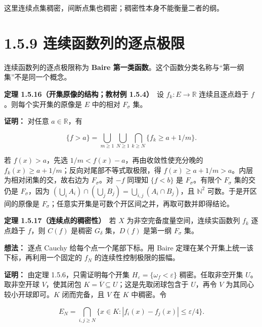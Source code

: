 \documentclass[11pt,a4paper]{article}
\begin{document}
这里连续点集稠密，间断点集也稠密；稠密性本身不能衡量二者的纲。

\section[\S{}1.5.9
连续函数列的逐点极限]{1.5.9
连续函数列的逐点极限}\label{ux8fdeux7eedux51fdux6570ux5217ux7684ux9010ux70b9ux6781ux9650}

连续函数列的逐点极限称为 \textbf{Baire
第一类函数}。这个函数分类名称与``第一纲集''不是同一个概念。

\textbf{定理 1.5.16（开集原像的结构；教材例 1.5.4）}　设
\(f_k:E\to\mathbb R\) 连续且逐点趋于 \(f\)。则每个实开集的原像是 \(E\)
中的相对 \(F_\sigma\) 集。

\textbf{证明：} 对任意 \(a\in\mathbb R\)，有

\begin{equation*}
\{f>a\}=\bigcup_{m\ge1}\bigcup_{N\ge1}\bigcap_{k\ge N}\{f_k\ge a+1/m\}.
\tag{1.5.14}
\end{equation*}

若 \(f(x)>a\)，先选 \(1/m<f(x)-a\)，再由收敛性使充分晚的
\(f_k(x)\ge a+1/m\)；反向对尾部不等式取极限，得
\(f(x)\ge a+1/m>a\)。内层为相对闭集的交，故右边为 \(F_\sigma\)。对
\(-f\) 同理知 \(\{f<b\}\) 是 \(F_\sigma\)。有限个 \(F_\sigma\)
集的交仍是 \(F_\sigma\)，因为
\((\bigcup_iA_i)\cap(\bigcup_jB_j)=\bigcup_{i,j}(A_i\cap B_j)\)，且
\(\mathbb N^2\) 可数。于是开区间的原像是
\(F_\sigma\)；任意实开集是可数个开区间之并，再取可数并即得结论。

\textbf{定理 1.5.17（连续点的稠密性）}　若 \(X\)
为非空完备度量空间，连续实函数列 \(f_k\) 逐点趋于 \(f\)，则 \(C(f)\)
是稠密 \(G_\delta\) 集，\(D(f)\) 是第一纲 \(F_\sigma\) 集。

\textbf{想法：} 逐点 Cauchy 给每个点一个尾部下标。用 Baire
定理在某个开集上统一该下标，再利用一个固定的 \(f_N\)
的连续性控制极限的振幅。

\textbf{证明：} 由定理 1.5.6，只需证明每个开集
\(H_\varepsilon=\{\omega_f<\varepsilon\}\) 稠密。任取非空开集
\(U\)。取非空开球 \(V\)，使其闭包
\(K=\overline V\subseteq U\)；这是先取闭球包含于 \(U\)，再令 \(V\)
为其同心较小开球即可。\(K\) 闭而完备，且 \(V\) 在 \(K\) 中稠密。令

\begin{equation*}
E_N=\bigcap_{i,j\ge N}\{x\in K:|f_i(x)-f_j(x)|\le\varepsilon/4\}.
\tag{1.5.15}
\end{equation*}
\end{document}
